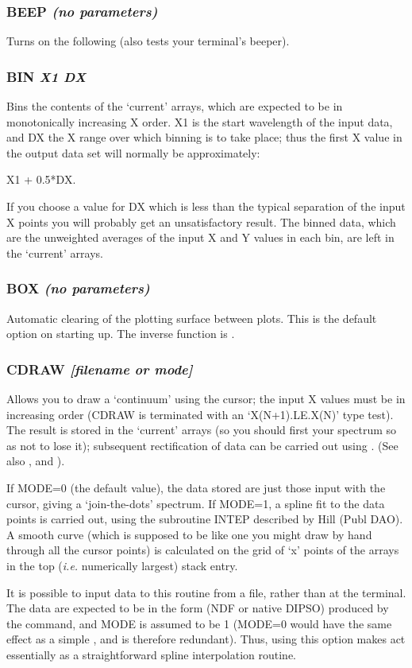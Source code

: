 \documentclass[twoside,11pt,noabs,nolof]{starlink}
\providecommand{\dipcom}[3]{\subsubsection*{\label{COM:#1}\textbf{#1} \emph{#2}}}
\begin{document}
\dipcom{BEEP}{(no parameters)}{Causes a beep after every error}
Turns on the   following   (also tests your terminal's beeper).

\dipcom{BIN}{X1 DX}{Bins the contents of the current arrays}
Bins the contents of the `current' arrays, which are expected to be in
monotonically increasing X order. X1 is the start wavelength of the
input data, and DX the X range over which binning is to take place;
thus the first X value in the output data set will normally be
approximately:

\begin{terminalv}
X1 + 0.5*DX.
\end{terminalv}

If you choose a value for DX which is less than the typical separation
of the input X points you will probably get an unsatisfactory result.
The binned data, which are the unweighted averages of the input X and
Y values in each bin, are left in the `current' arrays.

\dipcom{BOX}{(no parameters)}{Causes the plotting surface to be cleared between plots}
Automatic clearing of the plotting surface between plots. This is the
default option on starting up. The inverse function is .

\dipcom{CDRAW}{[filename or mode]}{Draws a 'continuum' using the cursor or by fitting data in a file}
Allows you to draw a `continuum' using the cursor; the input X values
must be in increasing order (CDRAW is terminated with an
`X(N+1).LE.X(N)' type test). The result is stored in the `current'
arrays (so you should first   your spectrum so as not to lose it);
subsequent rectification of data can be carried out using .  (See
also ,    and ).

If MODE=0 (the default value), the data stored are just those input
with the cursor, giving a `join-the-dots' spectrum. If MODE=1, a
spline fit to the data points is carried out, using the subroutine
INTEP described by Hill (Publ DAO). A smooth curve (which is supposed
to be like one you might draw by hand through all the cursor points)
is calculated on the grid of `x' points of the arrays in the top (\emph{i.e.} numerically largest) stack entry.

It is possible to input data to this routine from a file, rather than at the
terminal. The data are expected to be in the form (NDF or native DIPSO) produced
by the   command, and MODE is assumed to be 1 (MODE=0 would have the
same effect as a simple ,  and is therefore redundant). Thus, using this
option makes   act essentially as a straightforward spline interpolation
routine.
\end{document}
